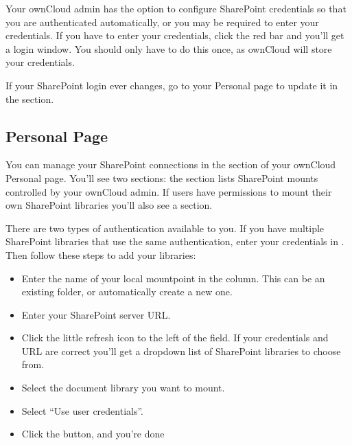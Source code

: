 \documentclass[letterpaper,10pt,english]{sphinxmanual}
\begin{document}
Your ownCloud admin has the option to configure SharePoint credentials so that
you are authenticated automatically, or you may be required to enter your
credentials. If you have to enter your credentials, click the red bar and you'll
get a login window. You should only have to do this once, as ownCloud will store
your credentials.

If your SharePoint login ever changes, go to your Personal page to update it in
the  section.


\subsection{Personal Page}
\label{external_storage/sharepoint_connecting:personal-page}
You can manage your SharePoint connections in the  section of your ownCloud Personal page. You'll see two sections:
the  section lists SharePoint mounts controlled by
your ownCloud admin. If users have permissions to mount their own SharePoint
libraries you'll also see a  section.

There are two types of authentication available to you. If you have multiple
SharePoint libraries that use the same authentication, enter your credentials
in . Then follow these steps to add your
libraries:
\begin{itemize}
\item {} 
Enter the name of your local mountpoint in the  column.
This can be an existing folder, or automatically create a new one.

\item {} 
Enter your SharePoint server URL.

\item {} 
Click the little refresh icon to the left of the  field.
If your credentials and URL are correct you'll get a dropdown list of SharePoint
libraries to choose from.

\item {} 
Select the document library you want to mount.

\item {} 
Select ``Use user credentials''.

\item {} 
Click the  button, and you're done

\end{itemize}
\end{document}
